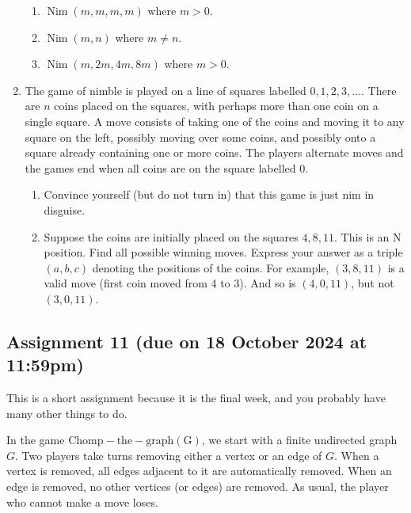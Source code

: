 \documentclass{amsart}
\begin{document}
\begin{enumerate}
\begin{enumerate}
\item \(\operatorname{Nim}(m,m,m,m)\) where \(m > 0\).

\item \(\operatorname{Nim}(m,n)\) where \(m \neq n\).

\item \(\operatorname{Nim}(m,2m,4m,8m)\) where \(m > 0\).
\end{enumerate}

\item The game of nimble is played on a line of squares labelled \(0, 1, 2, 3, \ldots\).
There are \(n\) coins placed on the squares, with perhaps more than one coin on a single square.
A move consists of taking one of the coins and moving it to any square on the left, possibly moving over some coins, and possibly onto a square already containing one or more coins. The players alternate moves and the games end when all coins are on the square labelled \(0\).

\begin{enumerate}
\item Convince yourself (but do not turn in) that this game is just nim in disguise.
\item Suppose the coins are initially placed on the squares \(4, 8, 11\).
This is an N position.
Find all possible winning moves.
Express your answer as a triple \((a,b,c)\) denoting the positions of the coins.
For example, \((3, 8, 11)\) is a valid move (first coin moved from 4 to 3).
And so is \((4, 0, 11)\), but not \((3,0,11)\).
\end{enumerate}
\end{enumerate}
\subsection{Assignment 11  (due on 18 October 2024 at 11:59pm)}
\label{sec:org70a32ad}
\togglefalse{solutions}

This is a short assignment because it is the final week, and you probably have many other things to do.

In the game \(\operatorname{Chomp-the-graph(G)}\), we start with a finite undirected graph \(G\).
Two players take turns removing either a vertex or an edge of \(G\).
When a vertex is removed, all edges adjacent to it are automatically removed.
When an edge is removed, no other vertices (or edges) are removed.
As usual, the player who cannot make a move loses.
\end{document}
